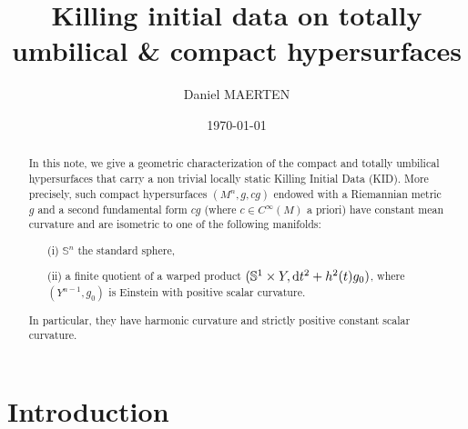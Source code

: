 \documentclass[a4paper,11pt,leqno]{amsart}
\title[KID on totally umbilical \& compact hypersurfaces]{Killing initial data on totally umbilical \& compact hypersurfaces}
\author{Daniel MAERTEN}
\date{\today}
\numberwithin{equation}{section}
\theoremstyle{main}
\begin{document}
\begin{abstract}
	In this note, we give a geometric characterization of the compact and totally umbilical hypersurfaces that carry a non trivial locally static Killing Initial Data (KID). More precisely, such compact hypersurfaces $(M^n,g, cg)$ endowed with a Riemannian metric $g$ and a second fundamental form $cg$ (where $c\in C^{\infty}(M)$ a priori) have constant mean curvature and are isometric to one of the following manifolds:
\begin{itemize}
	\item[(i)] ${{\mathbb S^{n}}}$ the standard sphere,
	\item[(ii)] a finite quotient  of a warped product $(\mathbb S^1 \times Y, {{\rm d}} t^2 + h^2 (t)g_0)$, where $(Y^{n-1},g_0)$ is Einstein with positive scalar curvature.
\end{itemize}
In particular, they have harmonic curvature and strictly positive constant scalar curvature.
\end{abstract}

\maketitle

\section{Introduction}
\end{document}
